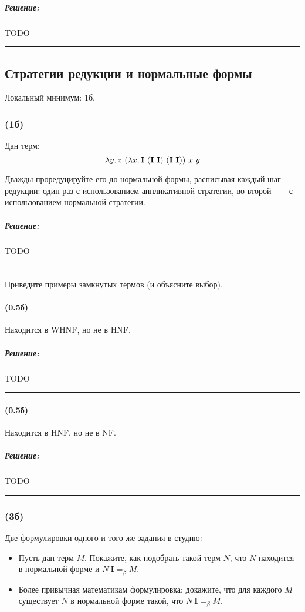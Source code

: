 \documentclass{article}
\newenvironment{proof}{\subparagraph{\hspace{-1em}Решение:\newline}}{\par\noindent\rule{\textwidth}{0.4pt}}
\newcommand{\comb}[1]{\mathbf{#1}}
\newcommand{\eqbeta}{=_\beta}
\begin{document}
    \begin{proof}
        TODO %
    \end{proof}

    \subsection{Стратегии редукции и нормальные формы}

    Локальный минимум: 1б.

    \subsubsection{(1б)}

    Дан терм:
    \[\lambda y\ldotp z~(\lambda x\ldotp \comb{I}~(\comb{I}~\comb{I})~(\comb{I}~\comb{I}))~x~y\]

    Дважды проредуцируйте его до нормальной формы, расписывая каждый шаг редукции: один раз с использованием аппликативной стратегии, во второй ~--- с
    использованием нормальной стратегии.

    \begin{proof}
        TODO %
    \end{proof}

    \subsubsection{}

    Приведите примеры замкнутых термов (и объясните выбор).

    \paragraph{(0.5б)}

    Находится в WHNF, но не в HNF.

    \begin{proof}
        TODO %
    \end{proof}

    \paragraph{(0.5б)}

    Находится в HNF, но не в NF.

    \begin{proof}
        TODO %
    \end{proof}

    \subsubsection{(3б)}

    Две формулировки одного и того же задания в студию:
    \begin{itemize}
        \item Пусть дан терм $M$.
        Покажите, как подобрать такой терм $N$, что $N$ находится в нормальной форме и $N~\comb{I} =_\beta M$.
        \item Более привычная математикам формулировка: докажите, что для каждого $M$ существует $N$ в нормальной форме такой, что $N~\comb{I} \eqbeta M$.
    \end{itemize}
\end{document}
